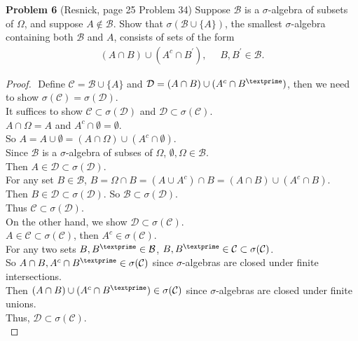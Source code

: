\documentclass{article}
\newcommand{\lld}{\mathcal{D}}
\newcommand{\llc}{\mathcal{C}}
\newcommand{\llb}{\mathcal{B}}
\begin{document}
 \setcounter{page}{9}
\vspace{3 mm}

\noindent \textbf{Problem 6} (Resnick, page 25 Problem 34) Suppose $\mathcal{B}$ is a $\sigma$-algebra of subsets of $\Omega$, and suppose $A \notin \mathcal{B}$.  Show that $\sigma(\mathcal{B} \cup \{A\})$, the smallest $\sigma$-algebra containing both $\mathcal{B}$ and $A$, consists of sets of the form
\begin{eqnarray*} (A \cap B) \cup (A^{c} \cap B^{'}), ~~~~~~ B, B^{'} \in \mathcal{B}. \end{eqnarray*}

\begin{proof}
	$ $\newline
	Define $\llc = \llb \cup \{A\}$ and $\lld = {(A \cap B) \cup (A^c \cap B^\textprime)}$, then we need to show $\sigma(\llc) = \sigma(\lld)$. \\
	It suffices to show $\llc \subset \sigma(\lld)$ and $\lld \subset \sigma(\llc)$.\\
	$A \cap \Omega = A$ and $A^c \cap \emptyset = \emptyset$.\\
	So $A = A \cup \emptyset = (A \cap \Omega) \cup  (A^c \cap \emptyset)$.\\
	Since $\llb$ is a $\sigma$-algebra of subses of $\Omega$, $\emptyset, \Omega \in \llb$.\\
	Then $A \in \lld \subset \sigma(\lld)$.\\
	For any set $B \in \llb$, $B = \Omega \cap B  = (A \cup A^c) \cap B = (A \cap B) \cup (A^c \cap B)$.\\
	Then $B \in \lld \subset \sigma(\lld)$. So $\llb \subset \sigma(\lld)$.\\
	Thus $\llc \subset \sigma(\lld)$.\\
	On the other hand, we show $\lld \subset \sigma(\llc)$. \\
	$A \in \llc \subset \sigma(\llc)$, then $A^c \in \sigma(\llc)$.\\
	For any two sets $B,B^\textprime \in \llb$, $B, B^\textprime \in \llc \subset \sigma(\llc)$.\\
	So $A\cap B, A^c\cap B^\textprime \in \sigma(\llc)$ since $\sigma$-algebras are closed under finite intersections.\\
	Then $(A\cap B) \cup (A^c \cap B^\textprime) \in \sigma(\llc)$ since $\sigma$-algebras are closed under finite unions.\\
	Thus, $\lld \subset \sigma(\llc)$.\\



\end{proof}
\end{document}
